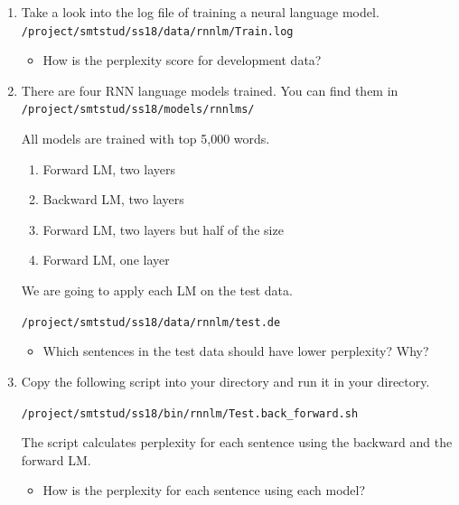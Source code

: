 \documentclass[12pt,fleqn]{article}
\begin{document}
\begin{enumerate} 

\item Take a look into the log file of training a neural language model. \\ 
\texttt{/project/smtstud/ss18/data/rnnlm/Train.log} \\ 

\begin{itemize} 
 \item How is the perplexity score for development data? 
\end{itemize}



\item There are four RNN language models trained. You can find them in \\ 
\texttt{/project/smtstud/ss18/models/rnnlms/} 

All models are trained with top 5,000 words. 
\begin{enumerate} 
 \item Forward LM, two layers 
 \item Backward LM, two layers 
 \item Forward LM, two layers but half of the size  
 \item Forward LM, one layer 
\end{enumerate}

We are going to apply each LM on the test data. 

\texttt{/project/smtstud/ss18/data/rnnlm/test.de} \\ 

\begin{itemize} 
 \item Which sentences in the test data should have lower perplexity? Why? 
\end{itemize}

\newpage 

\item Copy the following script into your directory and run it in your directory. 

\texttt{/project/smtstud/ss18/bin/rnnlm/Test.back\_forward.sh} 

The script calculates perplexity for each sentence using the backward and the forward LM. 

\begin{itemize} 
 \item How is the perplexity for each sentence using each model? 
\end{itemize}



\end{enumerate}
\end{document}
